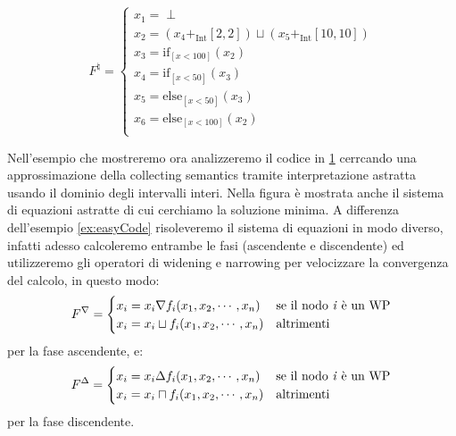 \begin{figure}
\begin{minipage}{\textwidth}
\vspace{1cm}
\[
F^{\natural}=
\begin{cases}
    x_1 = \perp \\
    x_2 = (x_4 +_{\textrm{Int}} [2, 2])\sqcup(x_5 +_{\textrm{Int}} [10, 10]) \\
    x_3 = \textrm{if}_{[x<100]}(x_2) \\
    x_4 = \textrm{if}_{[x<50]}(x_3) \\
    x_5 = \textrm{else}_{[x<50]}(x_3) \\
    x_6 = \textrm{else}_{[x<100]}(x_2) \\
\end{cases}
\]  
\end{minipage}
\caption{}
\label{fig:codiceEsempio2}
\end{figure}

\begin{example}
Nell'esempio che mostreremo ora analizzeremo il codice in \ref{fig:codiceEsempio2} cerrcando una approssimazione della collecting semantics tramite interpretazione astratta usando il dominio degli intervalli interi. Nella figura è mostrata anche il sistema di equazioni astratte di cui cerchiamo la soluzione minima. A differenza dell'esempio \ref{ex:easyCode} risoleveremo il sistema di equazioni in modo diverso, infatti adesso calcoleremo entrambe le fasi (ascendente e discendente) ed utilizzeremo gli operatori di widening e narrowing per velocizzare la convergenza del calcolo, in questo modo: 
\[
F^{\nabla} = 
\begin{cases}
    x_i = x_i \nabla f_i(x_1, x_2, \cdots, x_n) & \textrm{se il nodo \textit{i} è un WP} \\
    x_i = x_i \sqcup f_i(x_1, x_2, \cdots, x_n) & \textrm{altrimenti} \\
\end{cases}
\]
per la fase ascendente, e:
\[
F^{\Delta} = 
\begin{cases}
    x_i = x_i \Delta f_i(x_1, x_2, \cdots, x_n) & \textrm{se il nodo \textit{i} è un WP} \\
    x_i = x_i \sqcap f_i(x_1, x_2, \cdots, x_n) & \textrm{altrimenti} \\
\end{cases}
\]
per la fase discendente.
\end{example}